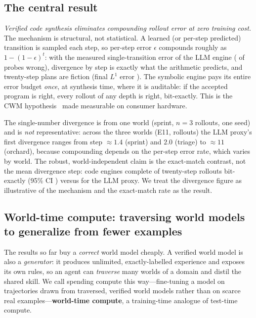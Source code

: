 \documentclass[11pt]{article}
\begin{document}
\subsection{The central result}\label{sec:central-result}
\emph{Verified code synthesis eliminates compounding rollout error at zero
training cost.} The mechanism is structural, not statistical. A learned (or
per-step predicted) transition is sampled each step, so per-step error
$\epsilon$ compounds roughly as $1-(1-\epsilon)^{t}$: with the measured
single-transition error of the LLM engine (\LLMProbeErrorRate{} of probes wrong),
divergence by step \LLMFirstDivergence{} is exactly what the arithmetic
predicts, and twenty-step plans are fiction (final $L^1$ error
\LLMFinalLOne). The symbolic engine pays its entire error budget \emph{once},
at synthesis time, where it is auditable: if the accepted program is right,
every rollout of any depth is right, bit-exactly. This is the CWM
hypothesis~\cite{worldcoder2024,cwmgames2025} made measurable on consumer
hardware.

The single-number divergence \LLMFirstDivergence{} is from one world (sprint,
$n{=}3$ rollouts, one seed) and is \emph{not} representative: across the three
worlds (E11, \MultiWorldRollouts{} rollouts) the LLM proxy's first divergence
ranges from step ${\approx}1.4$ (sprint) and $2.0$ (triage) to ${\approx}11$ (orchard),
because compounding depends on the per-step error rate, which varies by world.
The robust, world-independent claim is the exact-match contrast, not the mean
divergence step: code engines complete \MultiCodeExact{} of \MultiWorldRollouts{}
twenty-step rollouts bit-exactly (95\% CI \MultiCodeCI) versus \MultiLLMExact{}
for the LLM proxy. We treat the divergence figure as illustrative of the
mechanism and the exact-match rate as the result.

\subsection{World-time compute: traversing world models to generalize from fewer examples}\label{sec:world-time}
The results so far buy a \emph{correct} world model cheaply. A verified world model is also a
\emph{generator}: it produces unlimited, exactly-labelled experience and exposes its own
rules, so an agent can \emph{traverse} many worlds of a domain and distil the shared skill.
We call spending compute this way---fine-tuning a model on trajectories drawn from traversed,
verified world models rather than on scarce real examples---\textbf{world-time compute}, a
training-time analogue of test-time compute.
\end{document}
